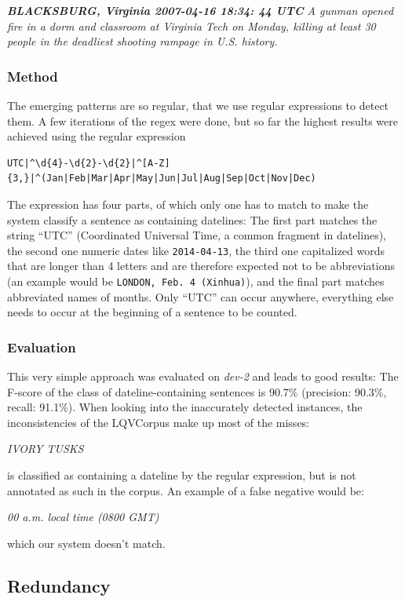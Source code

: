 \documentclass[a4paper,10pt]{scrartcl}
\theoremstyle{style}
\begin{document}
\textit{\textbf{BLACKSBURG, Virginia 2007-04-16 18:34: 44 UTC} A gunman opened fire in a dorm and classroom at Virginia Tech on Monday, killing at least 30 people in the deadliest shooting rampage in U.S. history.}



\subsubsection{Method}
The emerging patterns are so regular, that we use regular expressions to detect them. A few iterations of the regex were done, but so far the highest results were achieved using the regular expression

\begin{lstlisting}
UTC|^\d{4}-\d{2}-\d{2}|^[A-Z]{3,}|^(Jan|Feb|Mar|Apr|May|Jun|Jul|Aug|Sep|Oct|Nov|Dec)
\end{lstlisting}

The expression has four parts, of which only one has to match to make the system classify a sentence as containing datelines: The first part matches the string ``UTC'' (Coordinated Universal Time, a common fragment in datelines), the second one numeric dates like \texttt{2014-04-13}, the third one capitalized words that are longer than 4 letters and are therefore expected not to be abbreviations (an example would be \texttt{LONDON, Feb. 4 (Xinhua)}), and the final part matches abbreviated names of months. Only ``UTC'' can occur anywhere, everything else needs to occur at the beginning of a sentence to be counted.

\subsubsection{Evaluation}
This very simple approach was evaluated on \textit{dev-2} and leads to good results: The F-score of the class of dateline-containing sentences is 90.7\% (precision: 90.3\%, recall: 91.1\%). When looking into the inaccurately detected instances, the inconsistencies of the LQVCorpus make up most of the misses:

\textit{IVORY TUSKS}

is classified as containing a dateline by the regular expression, but is not annotated as such in the corpus. An example of a false negative would be:

\textit{00 a.m. local time (0800 GMT)}

which our system doesn't match.

\subsection{Redundancy}
\end{document}
